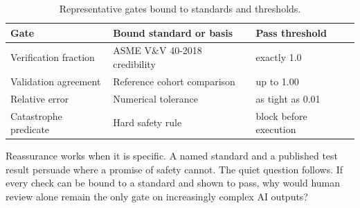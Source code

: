 \begin{table}[H]
\footnotesize
\begin{tabularx}{\textwidth}{@{}L{5.6cm} Y L{3.0cm}@{}}
\toprule
\textbf{Gate} & \textbf{Bound standard or basis} & \textbf{Pass threshold}\\
\midrule
Verification fraction & ASME V\&V 40-2018 credibility & exactly 1.0\\
Validation agreement & Reference cohort comparison & up to 1.00\\
Relative error & Numerical tolerance & as tight as 0.01\\
Catastrophe predicate & Hard safety rule & block before execution\\
\bottomrule
\end{tabularx}
\caption{Representative gates bound to standards and thresholds.}
\label{tab:trust}
\end{table}

Reassurance works when it is specific. A named standard and a published test
result persuade where a promise of safety cannot. The quiet question follows. If
every check can be bound to a standard and shown to pass, why would human review
alone remain the only gate on increasingly complex AI outputs?
